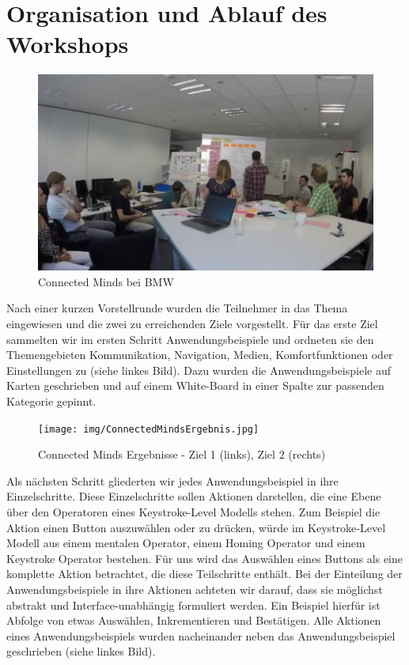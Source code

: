 \section[Ablauf]{Organisation und Ablauf des Workshops}
\begin{figure}[ht]
  \centering
  \includegraphics[width=1\textwidth]{img/ConnectedMind.jpg}
  \caption{Connected Minds bei BMW}
  \label{fig:ConnectedMind}
\end{figure} 
Nach einer kurzen Vorstellrunde wurden die Teilnehmer in das Thema eingewiesen und die zwei zu erreichenden Ziele vorgestellt. 
Für das erste Ziel sammelten wir im ersten Schritt Anwendungsbeispiele und ordneten sie den Themengebieten Kommunikation, Navigation, Medien, Komfortfunktionen oder Einstellungen zu (siehe  linkes Bild). Dazu wurden die Anwendungsbeispiele auf Karten geschrieben und auf einem White-Board in einer Spalte zur passenden Kategorie gepinnt.
\begin{figure}[ht]
  \centering
  \texttt{[image: img/ConnectedMindsErgebnis.jpg]}
  \caption[Connected Minds Ergebnisse]{Connected Minds Ergebnisse - Ziel 1 (links), Ziel 2 (rechts)}
  \label{fig:ConnectedMindErgebnisse}
\end{figure}  

Als nächsten Schritt gliederten wir jedes Anwendungsbeispiel in ihre Einzelschritte. 
Diese Einzelschritte sollen Aktionen darstellen, die eine Ebene über den Operatoren eines Keystroke-Level Modells stehen. 
Zum Beispiel die Aktion einen Button auszuwählen oder zu drücken, würde im Keystroke-Level Modell aus einem mentalen Operator, einem Homing Operator und einem Keystroke Operator bestehen. 
Für uns wird das Auswählen eines Buttons als eine komplette Aktion betrachtet, die diese Teilschritte enthält. 
Bei der Einteilung der Anwendungsbeispiele in ihre Aktionen achteten wir darauf, dass sie möglichst abstrakt und Interface-unabhängig formuliert werden. 
Ein Beispiel hierfür ist Abfolge von etwas Auswählen, Inkrementieren und Bestätigen. Alle Aktionen eines Anwendungsbeispiels wurden nacheinander neben das Anwendungsbeispiel geschrieben (siehe  linkes Bild). 

